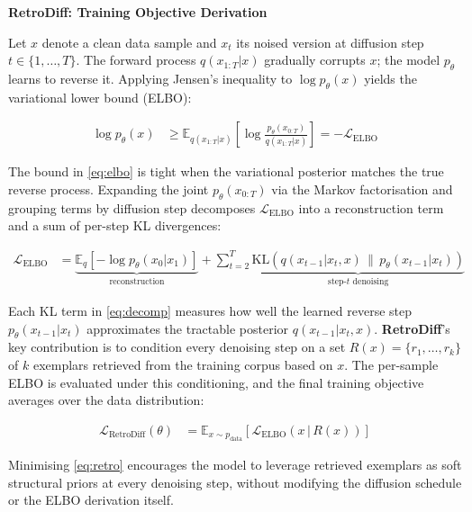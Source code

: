 \documentclass[11pt]{article}
\begin{document}
\pagestyle{empty}

\begin{center}
  {\large\bfseries RetroDiff: Training Objective Derivation}
\end{center}

\medskip

\noindent
Let $x$ denote a clean data sample and $x_t$ its noised version at diffusion step $t \in \{1,\ldots,T\}$.
The forward process $q(x_{1:T}|x)$ gradually corrupts $x$; the model $p_\theta$ learns to reverse it.
Applying Jensen's inequality to $\log p_\theta(x)$ yields the variational lower bound (ELBO):

\begin{align}
  \log p_\theta(x)
    &\geq \mathbb{E}_{q(x_{1:T}|x)}\!\left[\log\frac{p_\theta(x_{0:T})}{q(x_{1:T}|x)}\right]
     = -\mathcal{L}_{\mathrm{ELBO}}
  \label{eq:elbo}
\end{align}

\noindent
The bound in \eqref{eq:elbo} is tight when the variational posterior matches the true reverse process.
Expanding the joint $p_\theta(x_{0:T})$ via the Markov factorisation and grouping terms by diffusion step
decomposes $\mathcal{L}_{\mathrm{ELBO}}$ into a reconstruction term and a sum of per-step KL divergences:

\begin{align}
  \mathcal{L}_{\mathrm{ELBO}}
    &= \underbrace{\mathbb{E}_q[-\log p_\theta(x_0|x_1)]}_{\text{reconstruction}}
     + \sum_{t=2}^{T}
       \underbrace{\mathrm{KL}\!\left(q(x_{t-1}|x_t,x) \,\|\, p_\theta(x_{t-1}|x_t)\right)}_{\text{step-}t\text{ denoising}}
  \label{eq:decomp}
\end{align}

\noindent
Each KL term in \eqref{eq:decomp} measures how well the learned reverse step $p_\theta(x_{t-1}|x_t)$
approximates the tractable posterior $q(x_{t-1}|x_t,x)$.
\textbf{RetroDiff}'s key contribution is to condition every denoising step on a set
$R(x) = \{r_1,\ldots,r_k\}$ of $k$ exemplars retrieved from the training corpus based on $x$.
The per-sample ELBO is evaluated under this conditioning, and the final training objective
averages over the data distribution:

\begin{align}
  \mathcal{L}_{\mathrm{RetroDiff}}(\theta)
    &= \mathbb{E}_{x \sim p_{\mathrm{data}}}\!\left[
         \mathcal{L}_{\mathrm{ELBO}}\!\left(x \,\big|\, R(x)\right)
       \right]
  \label{eq:retro}
\end{align}

\noindent
Minimising \eqref{eq:retro} encourages the model to leverage retrieved exemplars as soft structural
priors at every denoising step, without modifying the diffusion schedule or the ELBO derivation itself.
\end{document}
